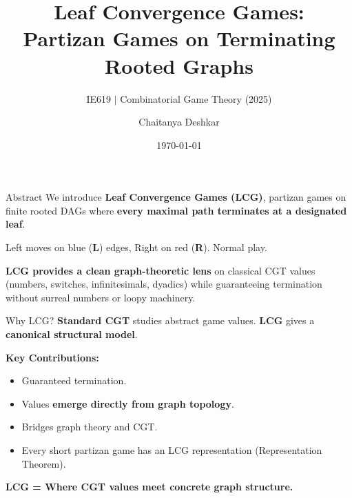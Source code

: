 \documentclass[10pt,aspectratio=169]{beamer}
\title{Leaf Convergence Games:\\ Partizan Games on Terminating Rooted Graphs}
\subtitle{IE619 $|$ Combinatorial Game Theory (2025)}
\author{Chaitanya Deshkar}
\date{\today}
\newcommand{\Lopt}[1]{{\color{lblue}\textbf{#1}}}
\newcommand{\Ropt}[1]{{\color{rred}\textbf{#1}}}
\begin{document}
\begin{frame}
  \maketitle 
\end{frame}

\begin{frame}{Abstract}
  We introduce \textbf{Leaf Convergence Games (LCG)}, partizan games on finite rooted DAGs where \textbf{every maximal path terminates at a designated leaf}.

  \vspace{8pt}
  Left moves on blue (\Lopt{L}) edges, Right on red (\Ropt{R}). Normal play.

  \vspace{10pt}
  \textbf{LCG provides a clean graph-theoretic lens} on classical CGT values (numbers, switches, infinitesimals, dyadics) while guaranteeing termination without surreal numbers or loopy machinery.
\end{frame}

\begin{frame}{Why LCG?}
  \textbf{Standard CGT} studies abstract game values.  
  \textbf{LCG} gives a \textbf{canonical structural model}.

  \vspace{12pt}
  \textbf{Key Contributions:}
  \begin{itemize}
    \item Guaranteed termination.
    \item Values \textbf{emerge directly from graph topology}.
    \item Bridges graph theory and CGT.
    \item Every short partizan game has an LCG representation (Representation Theorem).
  \end{itemize}

  \vspace{10pt}
  \centering
  \textbf{LCG = Where CGT values meet concrete graph structure.}
\end{frame}
\end{document}
